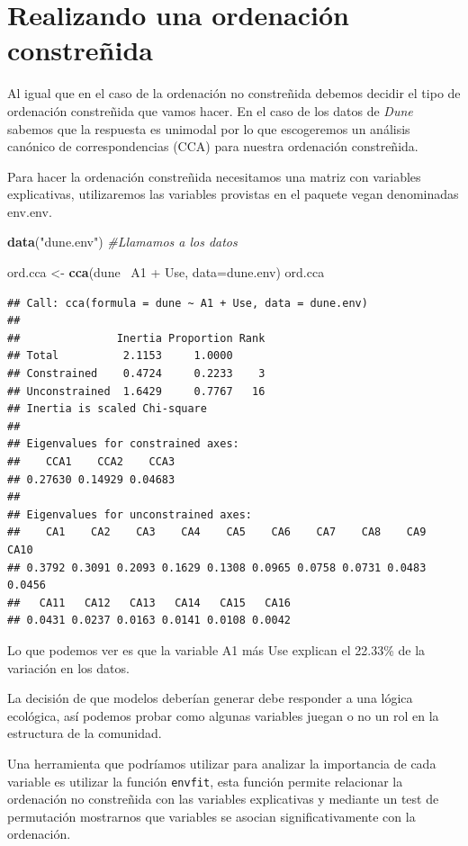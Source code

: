 \documentclass[]{book}
\newenvironment{Shaded}{\begin{snugshade}}{\end{snugshade}}
\newcommand{\KeywordTok}[1]{\textcolor[rgb]{0.13,0.29,0.53}{\textbf{{#1}}}}
\newcommand{\DataTypeTok}[1]{\textcolor[rgb]{0.13,0.29,0.53}{{#1}}}
\newcommand{\StringTok}[1]{\textcolor[rgb]{0.31,0.60,0.02}{{#1}}}
\newcommand{\CommentTok}[1]{\textcolor[rgb]{0.56,0.35,0.01}{\textit{{#1}}}}
\newcommand{\NormalTok}[1]{{#1}}
\begin{document}
\section{Realizando una ordenación
constreñida}\label{realizando-una-ordenacion-constrenida}

Al igual que en el caso de la ordenación no constreñida debemos decidir
el tipo de ordenación constreñida que vamos hacer. En el caso de los
datos de \emph{Dune} sabemos que la respuesta es unimodal por lo que
escogeremos un análisis canónico de correspondencias (CCA) para nuestra
ordenación constreñida.

Para hacer la ordenación constreñida necesitamos una matriz con
variables explicativas, utilizaremos las variables provistas en el
paquete vegan denominadas env.env.

\begin{Shaded}
\begin{Highlighting}[]
\KeywordTok{data}\NormalTok{(}\StringTok{"dune.env"}\NormalTok{) }\CommentTok{#Llamamos a los datos}

\NormalTok{ord.cca <-}\StringTok{ }\KeywordTok{cca}\NormalTok{(dune~}\StringTok{ }\NormalTok{A1 +}\StringTok{ }\NormalTok{Use, }\DataTypeTok{data=}\NormalTok{dune.env)}
\NormalTok{ord.cca}
\end{Highlighting}
\end{Shaded}

\begin{verbatim}
## Call: cca(formula = dune ~ A1 + Use, data = dune.env)
## 
##               Inertia Proportion Rank
## Total          2.1153     1.0000     
## Constrained    0.4724     0.2233    3
## Unconstrained  1.6429     0.7767   16
## Inertia is scaled Chi-square 
## 
## Eigenvalues for constrained axes:
##    CCA1    CCA2    CCA3 
## 0.27630 0.14929 0.04683 
## 
## Eigenvalues for unconstrained axes:
##    CA1    CA2    CA3    CA4    CA5    CA6    CA7    CA8    CA9   CA10 
## 0.3792 0.3091 0.2093 0.1629 0.1308 0.0965 0.0758 0.0731 0.0483 0.0456 
##   CA11   CA12   CA13   CA14   CA15   CA16 
## 0.0431 0.0237 0.0163 0.0141 0.0108 0.0042
\end{verbatim}

Lo que podemos ver es que la variable A1 más Use explican el 22.33\% de
la variación en los datos.

La decisión de que modelos deberían generar debe responder a una lógica
ecológica, así podemos probar como algunas variables juegan o no un rol
en la estructura de la comunidad.

Una herramienta que podríamos utilizar para analizar la importancia de
cada variable es utilizar la función \texttt{envfit}, esta función
permite relacionar la ordenación no constreñida con las variables
explicativas y mediante un test de permutación mostrarnos que variables
se asocian significativamente con la ordenación.
\end{document}
